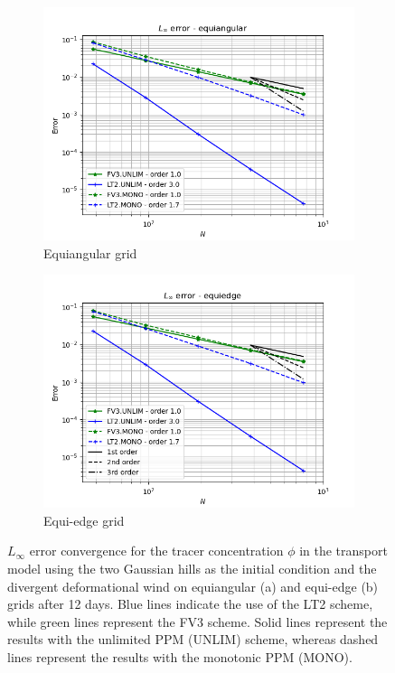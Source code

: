 \documentclass[preprint,12pt]{elsarticle}
\begin{document}
\begin{linenumbers}
\begin{figure}[!htb]
	\centering
	\begin{subfigure}{0.45\textwidth}
	\centering
	\includegraphics[width=1.1\linewidth]{linferror_tc-6_alpha0.equiangular}
	\caption{Equiangular grid\label{divnair-equiangular-linf}}
    \end{subfigure}
	\begin{subfigure}{0.45\textwidth}
		\centering
		\includegraphics[width=1.1\linewidth]{linferror_tc-6_alpha0.equiedge}
		\caption{Equi-edge grid\label{divnair-equiedge-linf}}
	\end{subfigure}
	\caption{
		$L_{\infty}$ error convergence for the tracer concentration $\phi$ in the transport model using the two Gaussian hills  as the initial condition and  the divergent deformational wind on equiangular  (a)
		and equi-edge (b) grids  after 12 days.
		Blue lines indicate the use of the LT2 scheme, while green lines represent the FV3 scheme.
		Solid lines represent the results with the unlimited PPM (UNLIM) scheme, whereas dashed lines represent the results with the monotonic PPM (MONO).
		\label{divnair-linf}}
\end{figure}



\end{linenumbers}
\end{document}
